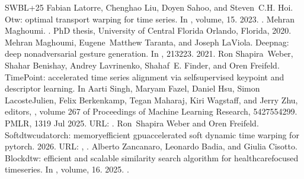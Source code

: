 \documentclass[letterpaper,10pt,english]{sphinxmanual}
\begin{document}
\begin{sphinxthebibliography}{SWBL+25}
\sphinxAtStartPar
Fabian Latorre, Chenghao Liu, Doyen Sahoo, and Steven C.H. Hoi. Otw: optimal transport warping for time series. In , volume, 1\textendash{}5. 2023. .
\sphinxAtStartPar
Mehran Maghoumi. . PhD thesis, University of Central Florida Orlando, Florida, 2020.
\sphinxAtStartPar
Mehran Maghoumi, Eugene Matthew Taranta, and Joseph LaViola. Deepnag: deep non\sphinxhyphen{}adversarial gesture generation. In , 213\textendash{}223. 2021.
\sphinxAtStartPar
Ron Shapira Weber, Shahar Benishay, Andrey Lavrinenko, Shahaf E. Finder, and Oren Freifeld. TimePoint: accelerated time series alignment via self\sphinxhyphen{}supervised keypoint and descriptor learning. In Aarti Singh, Maryam Fazel, Daniel Hsu, Simon Lacoste\sphinxhyphen{}Julien, Felix Berkenkamp, Tegan Maharaj, Kiri Wagstaff, and Jerry Zhu, editors, , volume 267 of Proceedings of Machine Learning Research, 54275\textendash{}54299. PMLR, 13\textendash{}19 Jul 2025. URL: .
\sphinxAtStartPar
Ron Shapira Weber and Oren Freifeld. Softdtw\sphinxhyphen{}cuda\sphinxhyphen{}torch: memory\sphinxhyphen{}efficient gpu\sphinxhyphen{}accelerated soft dynamic time warping for pytorch. 2026. URL: , .
\sphinxAtStartPar
Alberto Zancanaro, Leonardo Badia, and Giulia Cisotto. Blockdtw: efficient and scalable similarity search algorithm for healthcare\sphinxhyphen{}focused time\sphinxhyphen{}series. In , volume, 1\textendash{}6. 2025. .
\end{sphinxthebibliography}
\end{document}

